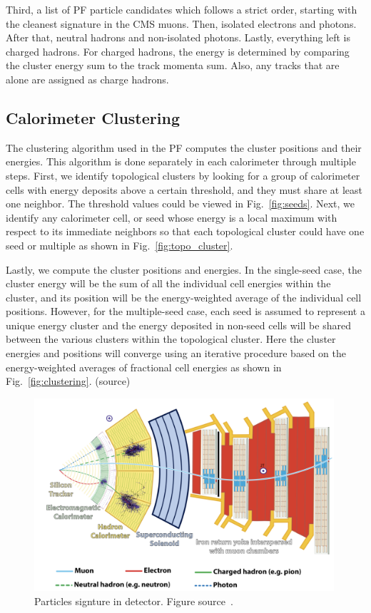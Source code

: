 Third, a list of PF particle candidates which follows a strict order, starting with the cleanest signature in the CMS muons.
Then, isolated electrons and photons.
After that, neutral hadrons and non-isolated photons.
Lastly, everything left is charged hadrons.
For charged hadrons, the energy is determined by comparing the cluster energy sum to the track momenta sum.
Also, any tracks that are alone are assigned as charge hadrons.

\subsection{Calorimeter Clustering}
The clustering algorithm used in the PF computes the cluster positions and their energies.
This algorithm is done separately in each calorimeter through multiple steps.
First, we identify topological clusters by looking for a group of calorimeter cells with energy deposits above a certain threshold, and they must share at least one neighbor.
The threshold values could be viewed in Fig.~\ref{fig:seeds}.
Next, we identify any calorimeter cell, or seed whose energy is a local maximum with respect to its immediate neighbors so that each topological cluster could have one seed or multiple as shown in Fig.~\ref{fig:topo_cluster}.

Lastly, we compute the cluster positions and energies.
In the single-seed case, the cluster energy will be the sum of all the individual cell energies within the cluster, and its position will be the energy-weighted average of the individual cell positions.
However, for the multiple-seed case, each seed is assumed to represent a unique energy cluster and the energy deposited in non-seed cells will be shared between the various clusters within the topological cluster.
Here the cluster energies and positions will converge using an iterative procedure based on the energy-weighted averages of fractional cell energies as shown in Fig.~\ref{fig:clustering}. (source)

\begin{figure}[t!]
\centering
\includegraphics[width=0.99\textwidth]{figures/particles_signture_in_detector.png}
\caption[Particles signture in detector]{Particles signture in detector. Figure source~\cite{}.}
\label{fig:Particles_in_CMS}
\end{figure}

